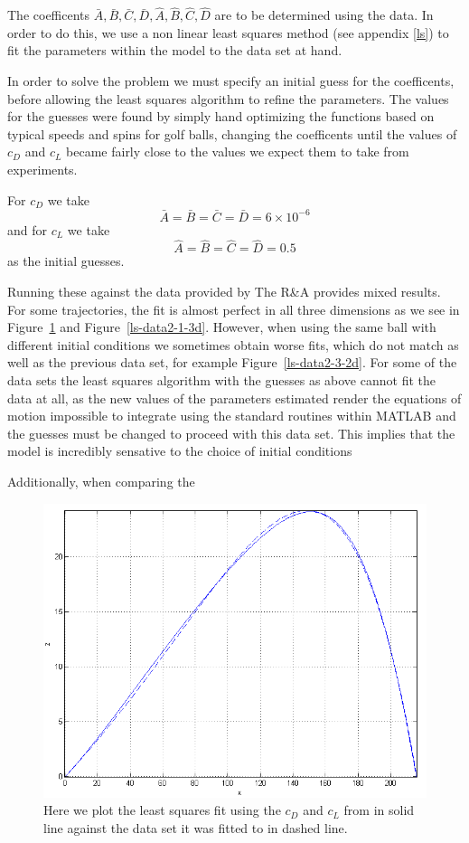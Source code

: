 The coefficents $\bar{A}, \bar{B}, \bar{C}, \bar{D}, \hat{A}, \hat{B}, \hat{C}, \hat{D}$ are to be
determined using the data. In order to do this, we use a non linear least squares method (see appendix 
\ref{ls}) to fit the parameters within the model to the data set at hand.

In order to solve the problem we must specify an initial guess for the coefficents, before allowing
the least squares algorithm to refine the parameters. The values for the guesses were found by 
simply hand optimizing the functions based on typical speeds and spins for golf balls, changing the
coefficents until the values of $c_D$ and $c_L$ became fairly close to the values we expect them to
take from experiments.

For $c_D$ we take
\[
\bar{A} = \bar{B} = \bar{C} = \bar{D} = 6 \times 10^{-6}
\]
and for $c_L$ we take
\[
\hat{A} = \hat{B} = \hat{C} = \hat{D} = 0.5
\]
as the initial guesses.

Running these against the data provided by The R\&A provides mixed results. For some trajectories, 
the fit is almost perfect in all three dimensions as we see in Figure~\ref{ls-data2-1-2d} and 
Figure~\ref{ls-data2-1-3d}. However,
when using the same ball with different initial conditions we sometimes obtain worse fits, which do not match
as well as the previous data set, for example Figure~\ref{ls-data2-3-2d}. For some of the data sets
the least squares algorithm with the guesses as above cannot fit the data at all, as the new values 
of the parameters estimated render the equations of motion impossible to integrate using the standard routines within
MATLAB and the guesses must be changed to proceed with this data set. This implies that the model
is incredibly sensative to the choice of initial conditions 

Additionally, when comparing the 

\begin{figure}
\centering
\includegraphics[scale=0.7]{../images/ls-data2-1-2d.png}
\caption[Least squares using the Re and Sr form on data]{Here we plot the least squares fit using
the $c_D$ and $c_L$ from \citet{Lieberman2001} in solid line against the data set it was fitted to
in dashed line.}
\label{ls-data2-1-2d}
\end{figure}

